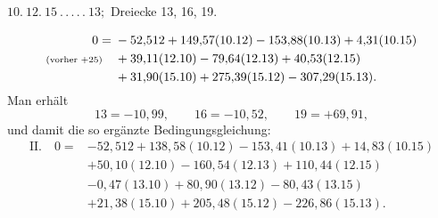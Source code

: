 \par\bigskip
\begin{center}
$10.\ 12.\ 15\ .\,.\,.\,.\,.\ 13;$ Dreiecke 13, 16, 19.
\end{center}
\[
\begin{aligned}
0={}&-52{,}512+149{,}57(10.12)-153{,}88(10.13)+4{,}31(10.15)\\
\text{\scriptsize(vorher $+25$)}\quad&+39{,}11(12.10)-79{,}64(12.13)+40{,}53(12.15)\\
&+31{,}90(15.10)+275{,}39(15.12)-307{,}29(15.13).
\end{aligned}
\]
Man erhält
\[
13=-10{,}99,\qquad16=-10{,}52,\qquad19=+69{,}91,
\]
und damit die so ergänzte Bedingungsgleichung:
\[
\begin{aligned}
\mathrm{II.}\quad 0={}&-52{,}512+138{,}58(10.12)-153{,}41(10.13)+14{,}83(10.15)\\
&+50{,}10(12.10)-160{,}54(12.13)+110{,}44(12.15)\\
&-0{,}47(13.10)+80{,}90(13.12)-80{,}43(13.15)\\
&+21{,}38(15.10)+205{,}48(15.12)-226{,}86(15.13).
\end{aligned}
\]
